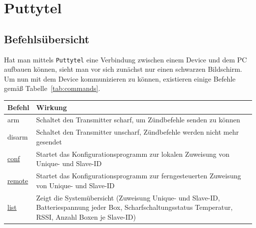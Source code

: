 \documentclass[paper=a4, parskip, numbers=noenddot, toc=listof, headsepline]{scrbook}
\begin{document}
		\section{Puttytel}

			\subsection{Befehlsübersicht}

				Hat man mittels \texttt{Puttytel} eine Verbindung zwischen einem Device und dem PC aufbauen können, sieht man vor sich zunächst nur einen schwarzen Bildschirm. Um nun mit dem Device kommunizieren zu können, existieren einige Befehle gemäß Tabelle~\ref{tab:commands}.

				\begin{table}[bt]
					\begin{center}
						\begin{tabu}
							to .9\textwidth {lX}
							\hline\hline
							\textbf{Befehl}                       & \textbf{Wirkung}                                                                                                                                                                                                                   \\ \hline
							arm                                   & Schaltet den Transmitter scharf, um Zündbefehle senden zu können                                                                                                                                                                   \\
							disarm                                & Schaltet den Transmitter unscharf, Zündbefehle werden nicht mehr gesendet                                                                                                                                                          \\ \hline
							\hyperref[subsec:localconf]{conf}     & Startet das Konfigurationsprogramm zur lokalen Zuweisung von Unique- und Slave-ID                                                                                                                                                  \\
							\hyperref[subsec:remoteconf]{remote}  & Startet das Konfigurationsprogramm zur ferngesteuerten Zuweisung von Unique- und Slave-ID                                                                                                                                          \\
							\hyperref[sec:list]{list}             & Zeigt die Systemübersicht (Zuweisung Unique- und Slave-ID, Batteriespannung jeder Box, Scharfschaltungsstatus Temperatur, RSSI, Anzahl Boxen je Slave-ID)                                                                          \\ \hline

\end{tabu}
\end{center}
\end{table}
\end{document}

